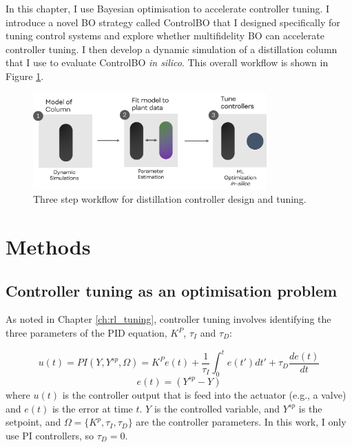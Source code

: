 In this chapter, I use Bayesian optimisation to accelerate controller tuning. I introduce a novel BO strategy called ControlBO that I  designed specifically for tuning control systems and explore whether multifidelity BO can accelerate controller tuning. I then develop a dynamic simulation of a distillation column that I use to evaluate ControlBO \textit{in silico}. This overall workflow is shown in Figure \ref{fig:tuning_workflow}.

\begin{figure}
    \centering
    \includegraphics[width=0.8\textwidth]{gfx/Chapter06/tuning_workflow.png}
    \caption{Three step workflow for distillation controller design and tuning.}
    \label{fig:tuning_workflow}
\end{figure}

\section{Methods}

\subsection{Controller tuning as an optimisation problem}

As noted in Chapter \ref{ch:rl_tuning}, controller tuning involves identifying the three parameters of the PID equation, $K^P$, $\tau_I$ and $\tau_D$:

\begin{equation}
    u(t) = PI(Y, Y^{sp}, \Omega) =  K^P e(t) + \frac{1}{\tau_I}\int_0^t e(t')dt' + \tau_D \frac{de(t)}{dt}
\end{equation}
\begin{equation}
    e(t) = (Y^{sp} - Y)
\end{equation}
where $u(t)$ is the controller output that is feed into the actuator (e.g., a valve) and $e(t)$ is the error at time $t$. $Y$ is the controlled variable, and $Y^{sp}$ is the setpoint, and $\Omega=\{K^p, \tau_I, \tau_D \}$ are the controller parameters. In this work, I only use PI controllers, so $\tau_D=0$.

